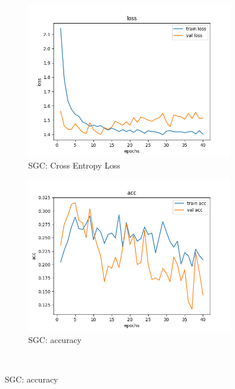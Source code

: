 \documentclass[a4paper]{article}
\begin{document}
\begin{figure}[ht]
    \begin{subfigure}{0.47\textwidth}
      \includegraphics[width=\linewidth]{../results/SGC_1/loss.png}
      \caption{SGC: Cross Entropy Loss}
    \end{subfigure}
    \hfill
    \begin{subfigure}{0.47\textwidth}
      \includegraphics[width=\linewidth]{../results/SGC_1/acc.png}
      \caption{SGC: accuracy}
    \end{subfigure}\\


\end{figure}
\end{document}
